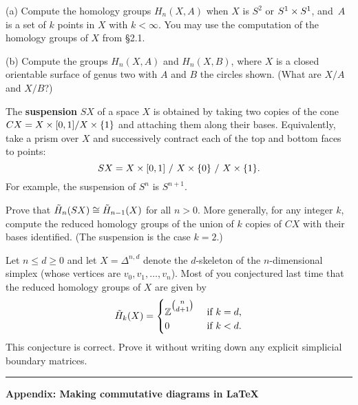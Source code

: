 \bigskip

\prob [Hatcher p.132 \#17] (a) Compute the homology groups $H_n(X,A)$ when $X$ is $S^2$ or $S^1\times S^1$, and~$A$ is a set of $k$ points in $X$ with $k<\infty$.  You may use the computation of the homology groups of $X$ from \S2.1.

(b) Compute the groups $H_n(X,A)$ and $H_n(X,B)$, where $X$ is a closed orientable surface of genus two with $A$ and $B$ the circles shown.  (What are $X/A$ and $X/B$?)

\pagebreak

\prob [Hatcher p.132 \#20] The \textbf{suspension} $SX$ of a space $X$ is obtained by taking two copies of the cone
$CX=X\times[0,1]/X\times\{1\}$ and attaching them along their bases.  Equivalently, take a prism over $X$ and successively contract each of the top and bottom faces to points:
\[SX = X \times [0,1] ~/~ X\times\{0\} ~/~ X\times\{1\}.\]
For example, the suspension of $S^n$ is $S^{n+1}$.

Prove that $\tilde H_n(SX)\cong \tilde H_{n-1}(X)$ for all $n>0$.  More generally, for any integer $k$, compute the reduced homology groups of the union of $k$ copies of $CX$ with their bases identified.  (The suspension is the case $k=2$.)

\prob Let $n\leq d\geq 0$ and let $X=\Delta^{n,d}$ denote the $d$-skeleton of the $n$-dimensional simplex (whose vertices are $v_0,v_1,\dots,v_n$).  Most of you conjectured last time that the reduced homology groups of $X$ are given by
\[\HH_k(X) = \begin{cases}
\Zz^{\raisebox{3.5bp}{$\binom{n}{d+1}$}} & \text{ if $k=d$,}\\
0 & \text{ if $k<d$}.
\end{cases}\]
This conjecture is correct.  Prove it without writing down any explicit simplicial boundary matrices.

\vfill\hrule\vfill

\textbf{\Large Appendix: Making commutative diagrams in LaTeX}


